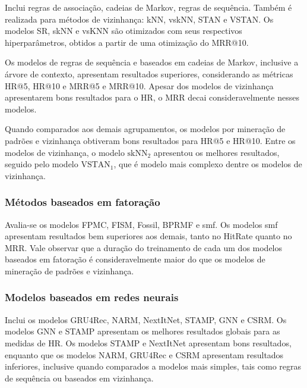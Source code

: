 Inclui regras de associação, cadeias de Markov, regras de
sequência. Também é realizada para métodos de vizinhança: kNN, vskNN, STAN e
VSTAN. Os modelos SR, skNN e vsKNN são otimizados com seus respectivos
hiperparâmetros, obtidos a partir de uma otimização do MRR@10.

Os modelos de regras de sequência e baseados em cadeias de Markov, inclusive a
árvore de contexto, apresentam resultados superiores, considerando as métricas
HR@5, HR@10 e MRR@5 e MRR@10. Apesar dos modelos de vizinhança apresentarem
bons resultados para o HR, o MRR decai consideravelmente nesses modelos.

Quando comparados aos demais agrupamentos, os modelos por mineração de padrões e
vizinhança obtiveram bons resultados para HR@5 e HR@10. Entre os modelos de
vizinhança, o modelo $\text{skNN}_2$ apresentou os melhores resultados, seguido pelo
modelo $\text{VSTAN}_1$, que é modelo mais complexo dentre os modelos de vizinhança.

\subsubsection{Métodos baseados em fatoração}
Avalia-se os modelos FPMC, FISM, Fossil,
BPRMF e smf. Os modelos smf apresentam resultados bem superiores aos demais, tanto no HitRate
quanto no MRR. Vale observar que a duração do treinamento de cada um dos modelos
baseados em fatoração é consideravelmente maior do que os modelos de mineração
de padrões e vizinhança.

\subsubsection{Modelos baseados em redes neurais}
Inclui os modelos GRU4Rec, NARM, NextItNet, STAMP, GNN e CSRM. Os modelos GNN e
STAMP apresentam os melhores resultados globais para as medidas de HR. Os
modelos STAMP e NextItNet apresentam bons resultados, enquanto que os modelos
NARM, GRU4Rec e CSRM apresentam resultados inferiores, inclusive quando comparados
a modelos mais simples, tais como regras de sequência ou baseados em vizinhança.


